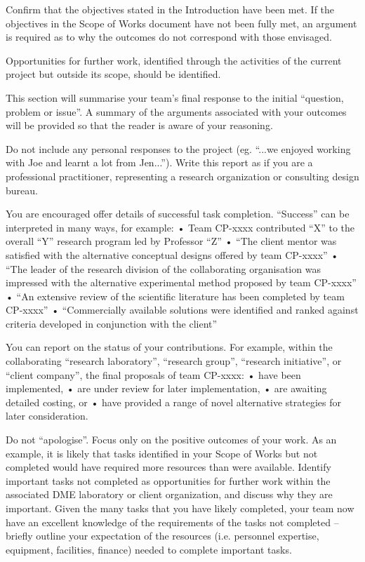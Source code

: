 Confirm that the objectives stated in the Introduction have been met. If the objectives in the Scope of Works document have not been fully met, an argument is required as to why the outcomes do not correspond with those envisaged.

Opportunities for further work, identified through the activities of the current project but outside its scope, should be identified.

This section will summarise your team’s final response to the initial “question, problem or issue”.  A summary of the arguments associated with your outcomes will be provided so that the reader is aware of your reasoning.

Do not include any personal responses to the project (eg. “...we enjoyed working with Joe and learnt a lot from Jen...”).  Write this report as if you are a professional practitioner, representing a research organization or consulting design bureau.

You are encouraged offer details of successful task completion. “Success” can be interpreted in many ways, for example: 
•	Team CP-xxxx contributed “X” to the overall “Y” research program led by Professor “Z”
•	“The client mentor was satisfied with the alternative conceptual designs offered by team CP-xxxx”
•	“The leader of the research division of the collaborating organisation was impressed with the alternative experimental method proposed by team CP-xxxx”
•	“An extensive review of the scientific literature has been completed by team CP-xxxx”
•	“Commercially available solutions were identified and ranked against criteria developed in conjunction with the client”

You can report on the status of your contributions.  For example, within the collaborating “research laboratory”, “research group”, “research initiative”, or “client company”, the final proposals of team CP-xxxx:
•	have been implemented,
•	are under review for later implementation,
•	are awaiting detailed costing, or
•	have provided a range of novel alternative strategies for later consideration.

Do not “apologise”.  Focus only on the positive outcomes of your work.  As an example, it is likely that tasks identified in your Scope of Works but not completed would have required more resources than were available.  Identify important tasks not completed as opportunities for further work within the associated DME laboratory or client organization, and discuss why they are important.  Given the many tasks that you have likely completed, your team now have an excellent knowledge of the requirements of the tasks not completed – briefly outline your expectation of the resources (i.e. personnel expertise, equipment, facilities, finance) needed to complete important tasks.
